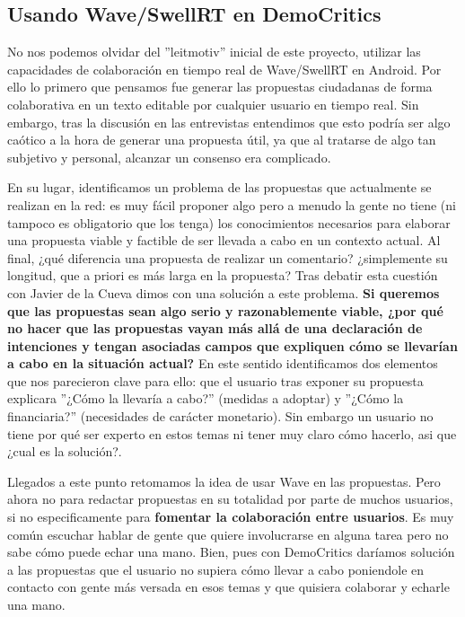 \subsection{Usando Wave/SwellRT en DemoCritics}

No nos podemos olvidar del ''leitmotiv'' inicial de este proyecto, utilizar las capacidades de colaboración en tiempo real de Wave/SwellRT en Android. Por ello lo primero que pensamos fue generar las propuestas ciudadanas de forma colaborativa en un texto editable por cualquier usuario en tiempo real. Sin embargo, tras la discusión en las entrevistas entendimos que esto podría ser algo caótico a la hora de generar una propuesta útil, ya que al tratarse de algo tan subjetivo y personal, alcanzar un consenso era complicado. 

En su lugar, identificamos un problema de las propuestas que actualmente se realizan en la red: es muy fácil proponer algo pero a menudo la gente no tiene (ni tampoco es obligatorio que los tenga) los conocimientos necesarios para elaborar una propuesta viable y factible de ser llevada a cabo en un contexto actual. Al final, ¿qué diferencia una propuesta de realizar un comentario? ¿simplemente su longitud, que a priori es más larga en la propuesta? Tras debatir esta cuestión con Javier de la Cueva dimos con una solución a este problema. \textbf{Si queremos que las propuestas sean algo serio y razonablemente viable, ¿por qué no hacer que las propuestas vayan más allá de una declaración de intenciones y tengan asociadas campos que expliquen cómo se llevarían a cabo en la situación actual?} En este sentido identificamos dos elementos que nos parecieron clave para ello: que el usuario tras exponer su propuesta explicara ''¿Cómo la llevaría a cabo?'' (medidas a adoptar) y ''¿Cómo la financiaria?'' (necesidades de carácter monetario). Sin embargo un usuario no tiene por qué ser experto en estos temas ni tener muy claro cómo hacerlo, asi que ¿cual es la solución?.

Llegados a este punto retomamos la idea de usar Wave en las propuestas. Pero ahora no para redactar propuestas en su totalidad por parte de muchos usuarios, si no especificamente para \textbf{fomentar la colaboración entre usuarios}. Es muy común escuchar hablar de gente que quiere involucrarse en alguna tarea pero no sabe cómo puede echar una mano. Bien, pues con DemoCritics daríamos solución a las propuestas que el usuario no supiera cómo llevar a cabo poniendole en contacto con gente más versada en esos temas y que quisiera colaborar y echarle una mano. 

